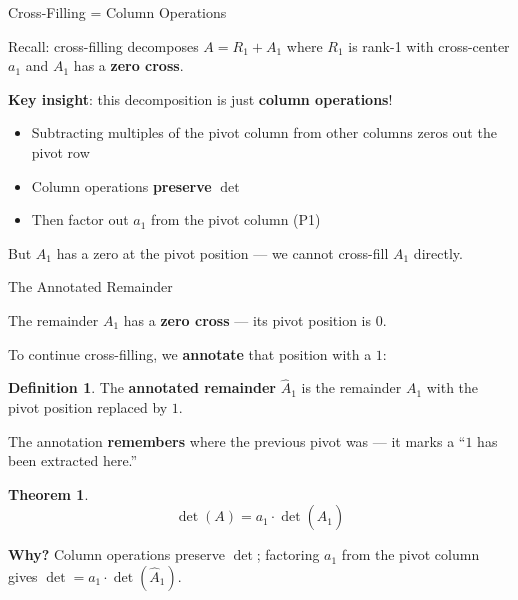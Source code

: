 \documentclass[10pt]{beamer}
\theoremstyle{definition}
\newtheorem{defi}{Definition}[section]
\newtheorem{thm}{Theorem}[section]
\newcommand{\x}[1]{\alert{\textbf{#1}}}
\begin{document}
\begin{frame}{Cross-Filling = Column Operations}

Recall: cross-filling decomposes $A = R_1 + A_1$ where $R_1$ is rank-1 with cross-center $a_1$ and $A_1$ has a \x{zero cross}.

\vfill

\x{Key insight}: this decomposition is just \x{column operations}!

\vfill

\begin{itemize}
\item Subtracting multiples of the pivot column from other columns zeros out the pivot row
\item Column operations \x{preserve} $\det$
\item Then factor out $a_1$ from the pivot column (P1)
\end{itemize}

\vfill

But $A_1$ has a zero at the pivot position --- we cannot cross-fill $A_1$ directly.

\end{frame}


\begin{frame}{The Annotated Remainder}

The remainder $A_1$ has a \x{zero cross} --- its pivot position is $0$.

To continue cross-filling, we \x{annotate} that position with a $1$:

\vfill

\begin{defi}
The \x{annotated remainder} $\widehat{A}_1$ is the remainder $A_1$ with the pivot position replaced by $1$.
\end{defi}

\vfill

The annotation \x{remembers} where the previous pivot was --- it marks a ``$1$ has been extracted here.''

\vfill

\begin{thm}
$$
\det(A) = a_1 \cdot \det(\widehat{A}_1)
$$
\end{thm}

\textbf{Why?} Column operations preserve $\det$; factoring $a_1$ from the pivot column gives $\det = a_1 \cdot \det(\widehat{A}_1)$.

\end{frame}
\end{document}
